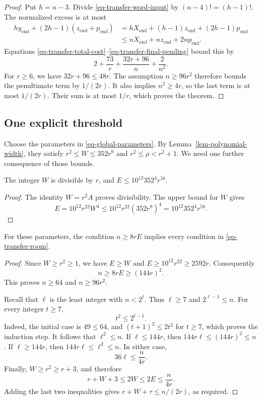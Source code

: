 \begin{proof}
Put $h=n-3$. Divide \eqref{eq-transfer-word-input} by $(n-4)!=(h-1)!$.
The normalized excess is at most
\begin{align*}
 h y_{\mathrm{end}}+(2h-1)(z_{\mathrm{end}}+p_{\mathrm{end}})
 &=hX_{\mathrm{end}}+(h-1)z_{\mathrm{end}}
   +(2h-1)p_{\mathrm{end}}\\
 &\le nX_{\mathrm{end}}+nz_{\mathrm{end}}+2np_{\mathrm{end}}.
\end{align*}
Equations \eqref{eq-transfer-total-cost}--\eqref{eq-transfer-final-pending}
bound this by
\[
 2+\frac{73}{r}+\frac{32r+96}{n}+\frac2{n^2}.
\]
For $r\ge6$, we have $32r+96\le48r$. The assumption $n\ge96r^2$
therefore bounds the penultimate term by $1/(2r)$. It also implies
$n^2\ge4r$, so the last term is at most $1/(2r)$. Their sum is at most
$1/r$, which proves the theorem.
\end{proof}

\subsection{One explicit threshold}

Choose the parameters in \eqref{eq-global-parameters}. By
Lemma~\ref{lem-polynomial-width}, they satisfy
$r^2\le W\le352r^9$ and $r^2\le\rho<r^2+1$. We need one further
consequence of those bounds.

\begin{lemma}\label{lem-transfer-parameter-bounds}
The integer $W$ is divisible by $r$, and
$E\le10^{12}352^4r^{58}$.
\end{lemma}

\begin{proof}
The identity $W=r^2A$ proves divisibility. The upper bound for $W$ gives
\[
 E=10^{12}r^{22}W^4
 \le10^{12}r^{22}(352r^9)^4
 =10^{12}352^4r^{58}.
\]
\end{proof}

\begin{lemma}\label{lem-transfer-binary-room}
For these parameters, the condition $n\ge8rE$ implies every condition
in \eqref{eq-transfer-room}.
\end{lemma}

\begin{proof}
Since $W\ge r^2\ge1$, we have $E\ge W$ and
$E\ge10^{12}r^{22}\ge2592r$. Consequently
\[
 n\ge8rE\ge(144r)^2.
\]
This proves $n\ge64$ and $n\ge96r^2$.

Recall that $\ell$ is the least integer with $n<2^\ell$.
Thus $\ell\ge7$ and $2^{\ell-1}\le n$. For every integer $t\ge7$,
\[
 t^2\le2^{t-1}.
\]
Indeed, the initial case is $49\le64$, and
$(t+1)^2\le2t^2$ for $t\ge7$, which proves the induction step.
It follows that $\ell^2\le n$. If $\ell\le144r$, then
$144r\ell\le(144r)^2\le n$. If $\ell\ge144r$, then
$144r\ell\le\ell^2\le n$. In either case,
\[
 36\ell\le\frac{n}{4r}.
\]
Finally, $W\ge r^2\ge r+3$, and therefore
\[
 r+W+3\le2W\le2E\le\frac{n}{4r}.
\]
Adding the last two inequalities gives
$r+W+\tau\le n/(2r)$, as required.
\end{proof}

